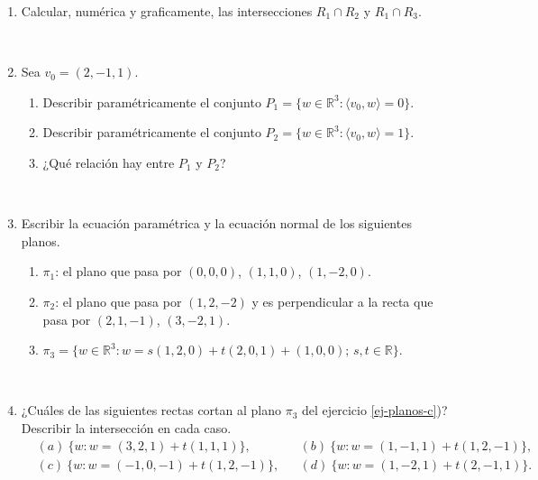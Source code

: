 \documentclass[11pt,spanish,makeidx,reqno]{amsbook}
\begin{document}
\begin{enumerate}
\

\item Calcular, num\'erica y graficamente, las intersecciones $R_1\cap R_2$ y $R_1\cap R_3$. 

\

\item Sea $v_0=(2,-1,1)$.
\begin{enumerate}
	\item Describir param{\'e}tricamente el conjunto
	$P_1=\{w\in\mathbb{ R}^3:\langle v_0 , w  \rangle=0\}$.
	\item Describir param{\'e}tricamente el conjunto
	$P_2=\{w\in\mathbb{ R}^3:\langle v_0 , w  \rangle=1\}$.
	\item ¿Qu\'e relaci\'on hay entre $P_1$ y $P_2$?
\end{enumerate}

\
\begin{comment}
\item Calcular.
\begin{enumerate}
	\item El {\'a}rea del tri{\'a}ngulo de v{\'e}rtices $(1,2)$, $(-1,2)$, $(2,4)$.
	\item El volumen del paralelep{\'\i}pedo definido por los vectores $(-2,3,1)$, $(1,1,2)$, $(1,2,3)$.
\end{enumerate}

\
\end{comment}



\item\label{ej-planos} Escribir la ecuaci{\'o}n paramétrica  y la ecuaci{\'o}n normal de los siguientes planos.
\begin{enumerate}
	\item $\pi_1$: el plano que pasa por $(0,0,0)$, $(1,1,0)$, $(1,-2,0)$.
	\item $\pi_2$: el plano que pasa por $(1,2,-2)$ y es perpendicular a la
	recta que pasa por $(2,1,-1)$, $(3,-2,1)$.
	\item\label{ej-planos-c}  $\pi_3=\{w\in\mathbb{R}^3: w=s(1,2,0)+t(2,0,1)+(1,0,0);\,s,t\in \mathbb R\}$.
\end{enumerate}

\


\item ¿Cu\'ales de las siguientes rectas cortan al plano $\pi_3$ del  ejercicio \ref{ej-planos-c})?
Describir la intersecci{\'o}n en cada caso.
\begin{align*}
&(a) \ \{w: w=(3,2,1)+t(1,1,1)\}, && (b) \  \{w: w=(1,-1,1)+t(1,2,-1)\}, \\
&(c)\  \{w: w=(-1,0,-1)+t(1,2,-1)\}, && (d) \  \{w: w=(1,-2,1)+t(2,-1,1)\}.
\end{align*}


\end{enumerate}
\end{document}
